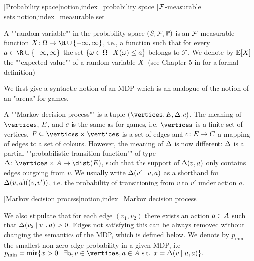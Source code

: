 [Probability space]{notion,index={probability space}}
[$\mathcal{F}$-measurable sets]{notion,index={measurable set}}

A ""random variable"" in the probability space $(S,\mathcal{F},\mathbb{P})$ is an $\mathcal{F}$-measurable function $\rvar\colon \Omega \rightarrow \R \cup
\{-\infty,\infty\}$, i.e.,
a function such that for every $a\in \R \cup \{ -\infty,\infty\}$ the set
$\{\omega\in \Omega\mid X(\omega)\leq a\}$ belongs to $\mathcal{F}$. We denote by $\mathbb{E}[X]$ the ""expected value"" of a random variable $X$~(see Chapter 5 in \cite{Bil:1995} for a formal definition).


We first give a syntactic notion of an MDP which is an analogue of the notion of an "arena" for games.

\begin{definition}[""MDP""]
\label{5-def:MDP}
A ""Markov decision process"" is a tuple $(\vertices,\edges,\probTranFunc,\colouring)$. The meaning of $\vertices$, $E$, and $c$ is the same as for games, i.e. $\vertices$ is a finite set of vertices, $\edges\subseteq \vertices\times\vertices$ is a set of edges and $c\colon E \rightarrow C$ a mapping of edges to a set of colours. However, the meaning of $\Delta$ is now different: $\Delta$ is a partial ""probabilistic transition function"" of type $\probTranFunc\colon \vertices \times \actions \rightarrow \dist(\edges)$, such that the support of $\Delta(v,a)$ only contains edges outgoing from $v$.
 We usually write $\Delta(v'\mid v,a)$ as a shorthand for $\Delta(v,a)((v,v'))$, i.e. the probability of transitioning from $v$ to $v'$ under action $a$.
\end{definition}

[Markov decision process]{notion,index={Markov decision process}}

We also stipulate that for each edge $(v_1,v_2)$ there exists an action $a\in A$ such that $\Delta(v_2\mid v_1,a)>0$. Edges not satisfying this can be always removed without changing the semantics of the MDP, which is defined below. We denote by $ p_{\min} $ the smallest non-zero edge probability in a given MDP, i.e. $ p_{\min} = \min\{x>0 \mid \exists u,v \in \vertices, a \in \actions \text{ s.t. } x = \probTranFunc(v\mid u,a)\}. $

